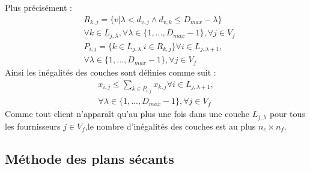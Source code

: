 \documentclass[12pt,a4paper]{article}
\begin{document}
\begin{multicols}{2}
Plus précisément :
\begin{align*}
&R_{k,j} = \{ v | \lambda < d_{v,j} \wedge d_{v,k}\leq D_{max}-\lambda \} \\ 
&\forall k \in L_{j,\lambda}, \forall \lambda \in \{ 1,...,D_{max}-1 \}, \forall j \in V_{f}\\
&P_{i,j} = \{ k \in L_{j,\lambda} \ i \in R_{k,j} \} \forall i \in L_{j,\lambda +1}, \\ 
&  \forall \lambda \in \{ 1,...,D_{max}-1 \}, \forall j \in V_{f}
\end{align*}
Ainsi les inégalités des couches sont définies comme suit : 
\begin{equation}\label{eq:layers}
\begin{aligned}
x_{i,j} \leq \sum_{k\in P_{i,j}}{x_{k,j}} \forall i \in L_{j,\lambda +1}, \\ \forall \lambda \in \{ 1,...,D_{max}-1 \}, \forall j \in V_{f}
\end{aligned}
\end{equation}
Comme tout client n'apparaît qu'au plus une fois dans une couche $L_{j,\lambda}$ pour tous les fournisseurs $j \in V_{f}$,le nombre d'inégalités des couches est au plus $n_{c}\times n_{f}$.
\subsection{Méthode des plans sécants}

\end{multicols}
\end{document}
